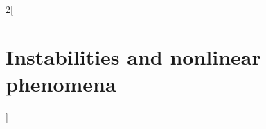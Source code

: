 \documentclass[../../../main_math.tex]{subfiles}
\begin{document}
\begin{multicols}{2}[\section{Instabilities and nonlinear phenomena}]

\end{multicols}
\end{document}
